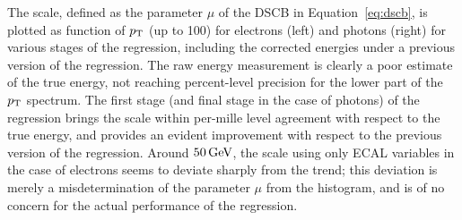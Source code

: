 The scale, defined as the parameter $\mu$ of the DSCB in Equation~\ref{eq:dscb}, is plotted as function of $p_\mathrm{T}$ (up to 100\GeV) for electrons (left) and photons (right) for various stages of the regression, including the corrected energies under a previous version of the regression.
% 
The raw energy measurement is clearly a poor estimate of the true energy, not reaching percent-level precision for the lower part of the $p_\mathrm{T}$ spectrum.
% 
The first stage (and final stage in the case of photons) of the regression brings the scale within per-mille level agreement with respect to the true energy, and provides an evident improvement with respect to the previous version of the regression.
% 
Around $50\,\text{GeV}$, the scale using only ECAL variables in the case of electrons seems to deviate sharply from the trend; this deviation is merely a misdetermination of the parameter $\mu$ from the histogram, and is of no concern for the actual performance of the regression.
% 


